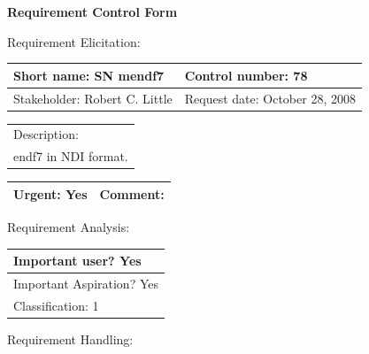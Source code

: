 \begin{center}\Large\bf
Requirement Control Form
\end{center}
\vspace{24pt}

Requirement Elicitation:

\begin{tabular}{|p{211pt}|p{211pt}|} \hline
Short name: SN mendf7 & Control number: 78\\ \hline
Stakeholder: Robert C. Little & Request date: October 28, 2008\\
\end{tabular}
\begin{tabular}{|p{433pt}|} \hline
Description: \\ 
endf7 in NDI format.\\
\hline
\end{tabular} 
\begin{tabular}{|p{211pt}|p{211pt}|} \hline
Urgent: Yes & Comment: \\ \hline
\end{tabular}

\vspace{24pt}

Requirement Analysis:

\begin{tabular}{|p{433pt}|} \hline
Important user? Yes \\ \hline
Important Aspiration? Yes \\ \hline
Classification: 1 \\ \hline
\end{tabular}
\vspace{24pt}

Requirement Handling:

